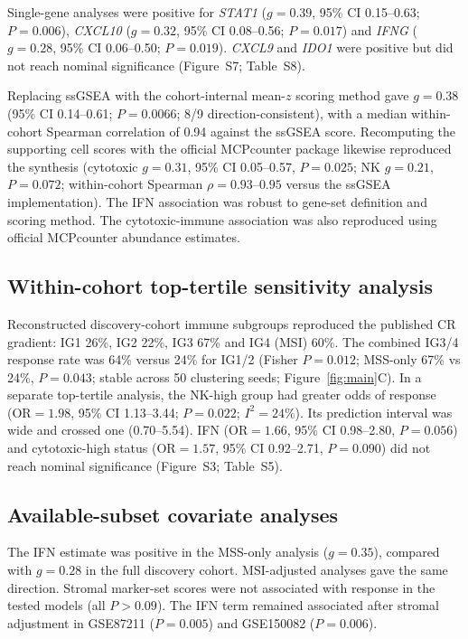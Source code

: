 \documentclass[11pt,a4paper]{article}
\begin{document}
Single-gene analyses were positive for \textit{STAT1} ($g=0.39$, 95\% CI 0.15--0.63; $P=0.006$), \textit{CXCL10} ($g=0.32$, 95\% CI 0.08--0.56; $P=0.017$) and \textit{IFNG} ($g=0.28$, 95\% CI 0.06--0.50; $P=0.019$). \textit{CXCL9} and \textit{IDO1} were positive but did not reach nominal significance (Figure~S7; Table~S8).

Replacing ssGSEA with the cohort-internal mean-$z$ scoring method gave $g=0.38$ (95\% CI 0.14--0.61; $P=0.0066$; 8/9 direction-consistent), with a median within-cohort Spearman correlation of 0.94 against the ssGSEA score. Recomputing the supporting cell scores with the official MCPcounter package likewise reproduced the synthesis (cytotoxic $g=0.31$, 95\% CI 0.05--0.57, $P=0.025$; NK $g=0.21$, $P=0.072$; within-cohort Spearman $\rho=0.93$--$0.95$ versus the ssGSEA implementation). The IFN association was robust to gene-set definition and scoring method. The cytotoxic-immune association was also reproduced using official MCPcounter abundance estimates.

\subsection{Within-cohort top-tertile sensitivity analysis}

Reconstructed discovery-cohort immune subgroups reproduced the published CR gradient: IG1 26\%, IG2 22\%, IG3 67\% and IG4 (MSI) 60\%. The combined IG3/4 response rate was 64\% versus 24\% for IG1/2 (Fisher $P=0.012$; MSS-only 67\% vs 24\%, $P=0.043$; stable across 50 clustering seeds; Figure~\ref{fig:main}C). In a separate top-tertile analysis, the NK-high group had greater odds of response (OR$=1.98$, 95\% CI 1.13--3.44; $P=0.022$; $I^2=24\%$). Its prediction interval was wide and crossed one (0.70--5.54). IFN (OR$=1.66$, 95\% CI 0.98--2.80, $P=0.056$) and cytotoxic-high status (OR$=1.57$, 95\% CI 0.92--2.71, $P=0.090$) did not reach nominal significance (Figure~S3; Table~S5).

\subsection{Available-subset covariate analyses}

The IFN estimate was positive in the MSS-only analysis ($g=0.35$), compared with $g=0.28$ in the full discovery cohort. MSI-adjusted analyses gave the same direction. Stromal marker-set scores were not associated with response in the tested models (all $P>0.09$). The IFN term remained associated after stromal adjustment in GSE87211 ($P=0.005$) and GSE150082 ($P=0.006$).
\end{document}
